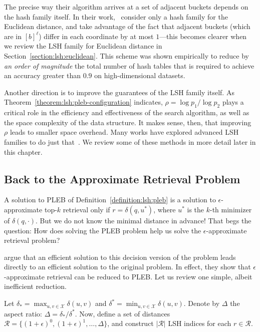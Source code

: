 The precise way their algorithm arrives at a set of adjacent buckets
depends on the hash family itself. In their work,~\cite{multiprobeLSH}
consider only a hash family for the Euclidean distance, and take advantage
of the fact that adjacent buckets (which are in $[b]^\ell$) differ in each
coordinate by at most $1$---this becomes clearer when we review the LSH family for
Euclidean distance in Section~\ref{section:lsh:euclidean}.
This scheme was shown empirically to reduce by \emph{an order of magnitude}
the total number of hash tables that is required to achieve an accuracy greater
than $0.9$ on high-dimensional datasets.

\medskip

Another direction is to improve the guarantees of the LSH family itself.
As Theorem~\ref{theorem:lsh:pleb-configuration} indicates, $\rho = \log p_1 / \log p_2$
plays a critical role in the efficiency and effectiveness of the search algorithm,
as well as the space complexity of the data structure.
It makes sense, then, that improving $\rho$ leads to smaller space overhead.
Many works have explored advanced LSH families to do just
that~\citep{andoni2008near-optimal,andoni2014beyond,andoni2015cross-polytope-lsh}.
We review some of these methods in more detail later in this chapter.

\subsection{Back to the Approximate Retrieval Problem}
A solution to PLEB of Definition~\ref{definition:lsh:pleb}
is a solution to $\epsilon$-approximate top-$k$ retrieval
only if $r = \delta(q, u^\ast)$, where $u^\ast$ is the $k$-th minimizer
of $\delta(q, \cdot)$. But we do not know the minimal distance in advance!
That begs the question: How does solving the PLEB problem
help us solve the $\epsilon$-approximate retrieval problem?

\cite{lsh} argue that an efficient solution to this decision version of the 
problem leads directly to an efficient solution to the original problem.
In effect, they show that $\epsilon$-approximate retrieval can be reduced
to PLEB. Let us review one simple, albeit inefficient reduction.

Let $\delta_\ast = \max_{u, v \in \mathcal{X}} \delta(u, v)$ and
$\delta^\ast = \min_{u, v \in \mathcal{X}} \delta(u, v)$. Denote by
$\Delta$ the aspect ratio: $\Delta = \delta_\ast / \delta^\ast$.
Now, define a set of distances $\mathcal{R} = \{ (1+\epsilon)^0, (1 + \epsilon)^1, \ldots, \Delta \}$,
and construct $\lvert \mathcal{R} \rvert$ LSH indices for each $r \in \mathcal{R}$.

